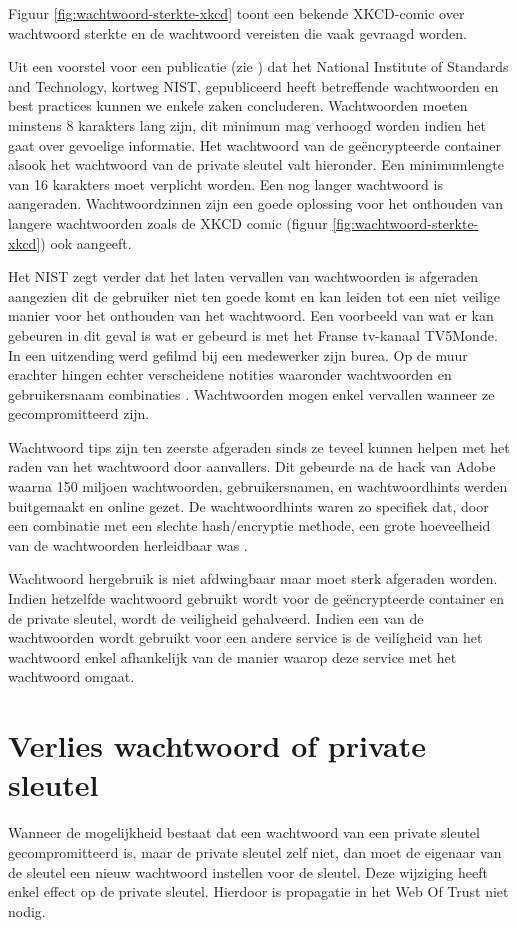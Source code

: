 Figuur \ref{fig:wachtwoord-sterkte-xkcd} toont een bekende XKCD-comic over
wachtwoord sterkte en de wachtwoord vereisten die vaak gevraagd worden.

Uit een voorstel voor een publicatie (zie
\textcite{NISTDigitalIdentityGuidelines}) dat het National Institute of
Standards and Technology, kortweg NIST, gepubliceerd heeft betreffende
wachtwoorden en best practices kunnen we enkele zaken concluderen. Wachtwoorden
moeten minstens 8 karakters lang zijn, dit minimum mag verhoogd worden indien
het gaat over gevoelige informatie. Het wachtwoord van de geëncrypteerde
container alsook het wachtwoord van de private sleutel valt hieronder. Een
minimumlengte van 16 karakters moet verplicht worden. Een nog langer wachtwoord
is aangeraden. Wachtwoordzinnen zijn een goede oplossing voor het onthouden van
langere wachtwoorden zoals de XKCD comic (figuur
\ref{fig:wachtwoord-sterkte-xkcd}) ook aangeeft.

Het NIST zegt verder dat het laten vervallen van wachtwoorden is afgeraden
aangezien dit de gebruiker niet ten goede komt en kan leiden tot een niet
veilige manier voor het onthouden van het wachtwoord. Een voorbeeld van wat er
kan gebeuren in dit geval is wat er gebeurd is met het Franse tv-kanaal
TV5Monde. In een uitzending werd gefilmd bij een medewerker zijn burea. Op de
muur erachter hingen echter verscheidene notities waaronder wachtwoorden en
gebruikersnaam combinaties \autocite{MachkovechMonde}. Wachtwoorden mogen enkel
vervallen wanneer ze gecompromitteerd zijn.

Wachtwoord tips zijn ten zeerste afgeraden sinds ze teveel kunnen helpen met het
raden van het wachtwoord door aanvallers. Dit gebeurde na de hack van Adobe
waarna 150 miljoen wachtwoorden, gebruikersnamen, en wachtwoordhints werden
buitgemaakt en online gezet. De wachtwoordhints waren zo specifiek dat, door een
combinatie met een slechte hash/encryptie methode, een grote hoeveelheid van de
wachtwoorden herleidbaar was \autocite{HernGuardianAdobeLeak}.

Wachtwoord hergebruik is niet afdwingbaar maar moet sterk afgeraden worden.
Indien hetzelfde wachtwoord gebruikt wordt voor de geëncrypteerde container en
de private sleutel, wordt de veiligheid gehalveerd. Indien een van de
wachtwoorden wordt gebruikt voor een andere service is de veiligheid van het
wachtwoord enkel afhankelijk van de manier waarop deze service met het
wachtwoord omgaat.

\section{Verlies wachtwoord of private sleutel}
\label{sec:verlies-wachtwoord-of-private-sleutel}
Wanneer de mogelijkheid bestaat dat een wachtwoord van een private sleutel
gecompromitteerd is, maar de private sleutel zelf niet, dan moet de eigenaar van
de sleutel een nieuw wachtwoord instellen voor de sleutel. Deze wijziging heeft
enkel effect op de private sleutel. Hierdoor is propagatie in het Web Of Trust
niet nodig.

